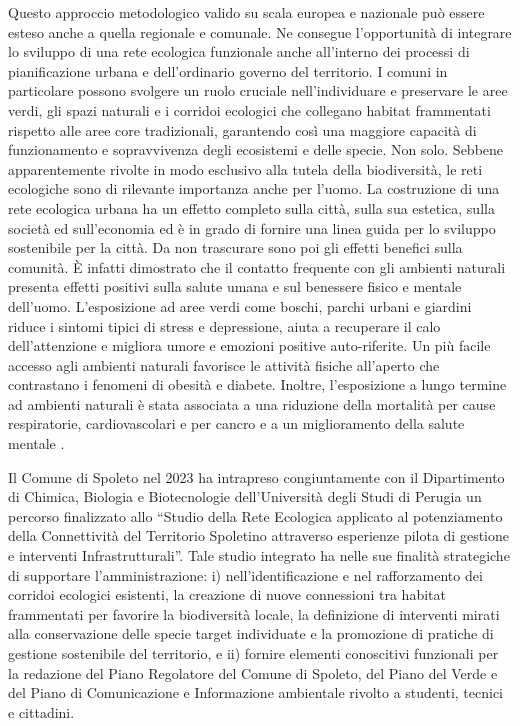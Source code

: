 \documentclass[
  a4paper,
]{book}
\begin{document}
Questo approccio metodologico valido su scala europea e nazionale può essere esteso anche a quella regionale e comunale. Ne consegue l'opportunità di integrare lo sviluppo di una rete ecologica funzionale anche all'interno dei processi di pianificazione urbana e dell'ordinario governo del territorio. I comuni in particolare possono svolgere un ruolo cruciale nell'individuare e preservare le aree verdi, gli spazi naturali e i corridoi ecologici che collegano habitat frammentati rispetto alle aree core tradizionali, garantendo così una maggiore capacità di funzionamento e sopravvivenza degli ecosistemi e delle specie. Non solo. Sebbene apparentemente rivolte in modo esclusivo alla tutela della biodiversità, le reti ecologiche sono di rilevante importanza anche per l'uomo. La costruzione di una rete ecologica urbana ha un effetto completo sulla città, sulla sua estetica, sulla società ed sull'economia ed è in grado di fornire una linea guida per lo sviluppo sostenibile per la città. Da non trascurare sono poi gli effetti benefici sulla comunità. È infatti dimostrato che il contatto frequente con gli ambienti naturali presenta effetti positivi sulla salute umana e sul benessere fisico e mentale dell'uomo. L'esposizione ad aree verdi come boschi, parchi urbani e giardini riduce i sintomi tipici di stress e depressione, aiuta a recuperare il calo dell'attenzione e migliora umore e emozioni positive auto-riferite. Un più facile accesso agli ambienti naturali favorisce le attività fisiche all'aperto che contrastano i fenomeni di obesità e diabete. Inoltre, l'esposizione a lungo termine ad ambienti naturali è stata associata a una riduzione della mortalità per cause respiratorie, cardiovascolari e per cancro e a un miglioramento della salute mentale \citep{aerts2018}.

Il Comune di Spoleto nel 2023 ha intrapreso congiuntamente con il Dipartimento di Chimica, Biologia e Biotecnologie dell'Università degli Studi di Perugia un percorso finalizzato allo ``Studio della Rete Ecologica applicato al potenziamento della Connettività del Territorio Spoletino attraverso esperienze pilota di gestione e interventi Infrastrutturali''. Tale studio integrato ha nelle sue finalità strategiche di supportare l'amministrazione: i) nell'identificazione e nel rafforzamento dei corridoi ecologici esistenti, la creazione di nuove connessioni tra habitat frammentati per favorire la biodiversità locale, la definizione di interventi mirati alla conservazione delle specie target individuate e la promozione di pratiche di gestione sostenibile del territorio, e ii) fornire elementi conoscitivi funzionali per la redazione del Piano Regolatore del Comune di Spoleto, del Piano del Verde e del Piano di Comunicazione e Informazione ambientale rivolto a studenti, tecnici e cittadini.
\end{document}
